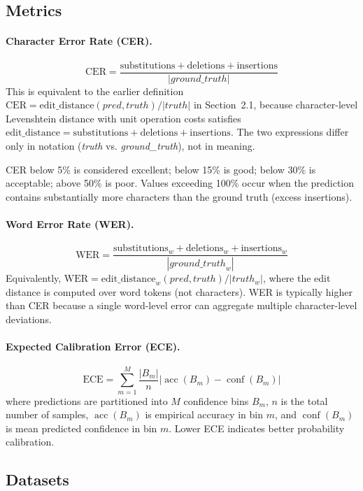 \documentclass[12pt,a4paper]{article}
\begin{document}
\subsection{Metrics}

\paragraph{Character Error Rate (CER).}
\[
  \text{CER} =
  \frac{\text{substitutions} + \text{deletions}
    + \text{insertions}}{|\mathit{ground\_truth}|}
\]
This is equivalent to the earlier definition
$\text{CER}=\text{edit\_distance}(\mathit{pred},\mathit{truth})/|\mathit{truth}|$
in Section~2.1, because character-level Levenshtein distance with unit
operation costs satisfies
$\text{edit\_distance}=\text{substitutions}+\text{deletions}+\text{insertions}$.
The two expressions differ only in notation (\emph{truth} vs.
\emph{ground\_truth}), not in meaning.

CER below 5\% is considered excellent; below 15\% is good; below
30\% is acceptable; above 50\% is poor. Values exceeding 100\% occur
when the prediction contains substantially more characters than the
ground truth (excess insertions).
\paragraph{Word Error Rate (WER).}
\[
  \text{WER} =
  \frac{\text{substitutions}_{w} + \text{deletions}_{w}
    + \text{insertions}_{w}}{|\mathit{ground\_truth}_{w}|}
\]
Equivalently,
$\text{WER}=\text{edit\_distance}_{w}(\mathit{pred},\mathit{truth})/|\mathit{truth}_{w}|$,
where the edit distance is computed over word tokens (not characters).
WER is typically higher than CER because a single word-level error can
aggregate multiple character-level deviations.

\paragraph{Expected Calibration Error (ECE).}
\[
  \text{ECE} = \sum_{m=1}^{M} \frac{|B_m|}{n}
  \left|\operatorname{acc}(B_m) - \operatorname{conf}(B_m)\right|
\]
where predictions are partitioned into $M$ confidence bins $B_m$,
$n$ is the total number of samples, $\operatorname{acc}(B_m)$ is
empirical accuracy in bin $m$, and $\operatorname{conf}(B_m)$ is mean
predicted confidence in bin $m$. Lower ECE indicates better
probability calibration.

\subsection{Datasets}
\end{document}
